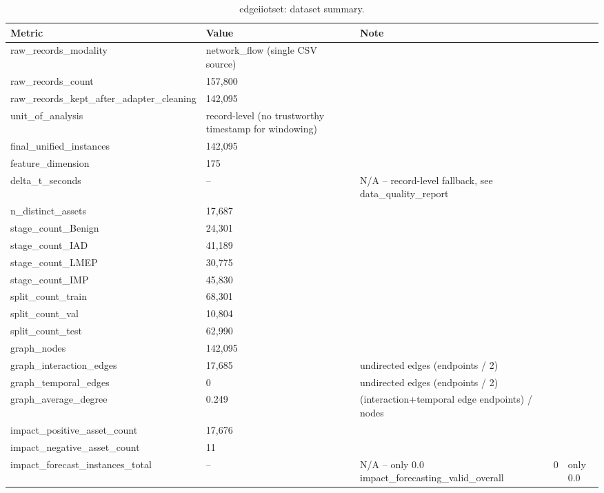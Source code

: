 \begin{table}[t]
\centering
\caption{edgeiiotset: dataset summary.}
\label{tab:edgeiiotset_dataset_summary}
\begin{tabular}{lll}
\toprule
Metric & Value & Note \\
\midrule
raw\_records\_modality & network\_flow (single CSV source) &  \\
raw\_records\_count & 157,800 &  \\
raw\_records\_kept\_after\_adapter\_cleaning & 142,095 &  \\
unit\_of\_analysis & record-level (no trustworthy timestamp for windowing) &  \\
final\_unified\_instances & 142,095 &  \\
feature\_dimension & 175 &  \\
delta\_t\_seconds & -- & N/A -- record-level fallback, see data\_quality\_report \\
n\_distinct\_assets & 17,687 &  \\
stage\_count\_Benign & 24,301 &  \\
stage\_count\_IAD & 41,189 &  \\
stage\_count\_LMEP & 30,775 &  \\
stage\_count\_IMP & 45,830 &  \\
split\_count\_train & 68,301 &  \\
split\_count\_val & 10,804 &  \\
split\_count\_test & 62,990 &  \\
graph\_nodes & 142,095 &  \\
graph\_interaction\_edges & 17,685 & undirected edges (endpoints / 2) \\
graph\_temporal\_edges & 0 & undirected edges (endpoints / 2) \\
graph\_average\_degree & 0.249 & (interaction+temporal edge endpoints) / nodes \\
impact\_positive\_asset\_count & 17,676 &  \\
impact\_negative\_asset\_count & 11 &  \\
impact\_forecast\_instances\_total & -- & N/A -- only 0.0%
impact\_forecasting\_valid\_overall & 0 & only 0.0%
\bottomrule
\end{tabular}
\end{table}
